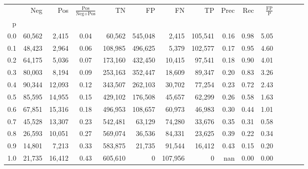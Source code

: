 \begin{tabular}{rrrcrrrrrrrrrrr}
\toprule
{} &     Neg &     Pos & $\frac{\text{Pos}}{\text{Neg}+\text{Pos}}$ &       TN &       FP &       FN &       TP &  Prec &   Rec & $\frac{\text{FP}}{\text{P}}$ \\
p   &         &         &                                            &          &          &          &          &       &       &                              \\
\midrule
0.0 &  60,562 &   2,415 &                                       0.04 &   60,562 &  545,048 &    2,415 &  105,541 &  0.16 &  0.98 &                         5.05 \\
0.1 &  48,423 &   2,964 &                                       0.06 &  108,985 &  496,625 &    5,379 &  102,577 &  0.17 &  0.95 &                         4.60 \\
0.2 &  64,175 &   5,036 &                                       0.07 &  173,160 &  432,450 &   10,415 &   97,541 &  0.18 &  0.90 &                         4.01 \\
0.3 &  80,003 &   8,194 &                                       0.09 &  253,163 &  352,447 &   18,609 &   89,347 &  0.20 &  0.83 &                         3.26 \\
0.4 &  90,344 &  12,093 &                                       0.12 &  343,507 &  262,103 &   30,702 &   77,254 &  0.23 &  0.72 &                         2.43 \\
0.5 &  85,595 &  14,955 &                                       0.15 &  429,102 &  176,508 &   45,657 &   62,299 &  0.26 &  0.58 &                         1.63 \\
0.6 &  67,851 &  15,316 &                                       0.18 &  496,953 &  108,657 &   60,973 &   46,983 &  0.30 &  0.44 &                         1.01 \\
0.7 &  45,528 &  13,307 &                                       0.23 &  542,481 &   63,129 &   74,280 &   33,676 &  0.35 &  0.31 &                         0.58 \\
0.8 &  26,593 &  10,051 &                                       0.27 &  569,074 &   36,536 &   84,331 &   23,625 &  0.39 &  0.22 &                         0.34 \\
0.9 &  14,801 &   7,213 &                                       0.33 &  583,875 &   21,735 &   91,544 &   16,412 &  0.43 &  0.15 &                         0.20 \\
1.0 &  21,735 &  16,412 &                                       0.43 &  605,610 &        0 &  107,956 &        0 &   nan &  0.00 &                         0.00 \\
\bottomrule
\end{tabular}
